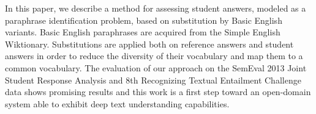 In this paper, we describe a method for assessing student answers, modeled as a paraphrase identification problem, based on substitution by Basic English
 variants. Basic English paraphrases are acquired from the Simple English
 Wiktionary. Substitutions are applied both on reference answers and student
 answers in order to reduce the diversity of their vocabulary and map them to a
 common vocabulary. The evaluation of our approach on the SemEval 2013 Joint
 Student Response Analysis and 8th Recognizing Textual Entailment Challenge data
 shows promising results and this work is a first step toward an open-domain
 system able to exhibit deep text understanding capabilities.

